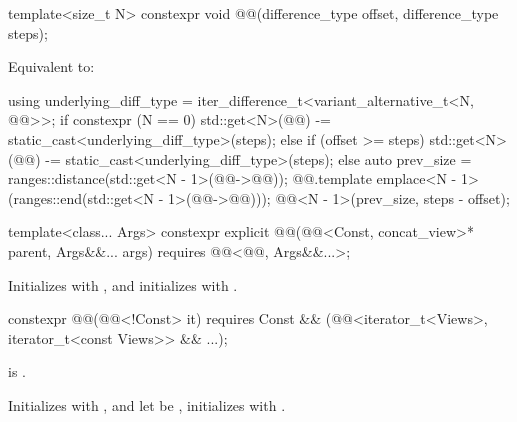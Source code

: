 %
\begin{itemdecl}
template<size_t N>
  constexpr void @@(difference_type offset, difference_type steps);
\end{itemdecl}

\begin{itemdescr}
\pnum
\effects
Equivalent to:
\begin{codeblock}
using underlying_diff_type = iter_difference_t<variant_alternative_t<N, @@>>;
if constexpr (N == 0) {
  std::get<N>(@@) -= static_cast<underlying_diff_type>(steps);
} else {
  if (offset >= steps) {
    std::get<N>(@@) -= static_cast<underlying_diff_type>(steps);
  } else {
    auto prev_size = ranges::distance(std::get<N - 1>(@@->@@));
    @@.template emplace<N - 1>(ranges::end(std::get<N - 1>(@@->@@)));
    @@<N - 1>(prev_size, steps - offset);
  }
}
\end{codeblock}
\end{itemdescr}

%
\begin{itemdecl}
template<class... Args>
  constexpr explicit @@(@@<Const, concat_view>* parent,
                              Args&&... args)
    requires @@<@@, Args&&...>;
\end{itemdecl}

\begin{itemdescr}
\pnum
\effects
Initializes  with , and
initializes  with .
\end{itemdescr}

%
\begin{itemdecl}
constexpr @@(@@<!Const> it)
  requires Const &&
           (@@<iterator_t<Views>, iterator_t<const Views>> && ...);
\end{itemdecl}

\begin{itemdescr}
\pnum
\expects
{} is .

\pnum
\effects
Initializes  with , and
let  be ,
initializes  with
.
\end{itemdescr}

